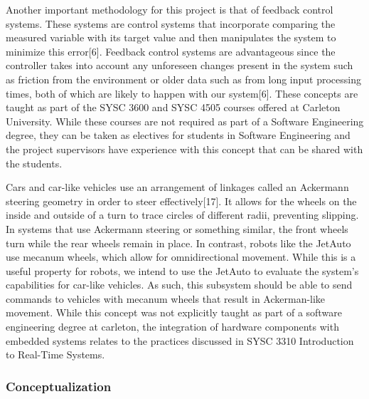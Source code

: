 \documentclass[titlepage]{article}
\begin{document}
Another important methodology for this project is that of feedback control systems. These systems are control systems that incorporate comparing the measured variable with its target value and then manipulates the system to minimize this error[6]. Feedback control systems are advantageous since the controller takes into account any unforeseen changes present in the system such as friction from the environment or older data such as from long input processing times, both of which are likely to happen with our system[6]. These concepts are taught as part of the SYSC 3600 and SYSC 4505 courses offered at Carleton University. While these courses are not required as part of a Software Engineering degree, they can be taken as electives for students in Software Engineering and the project supervisors have experience with this concept that can be shared with the students. 

Cars and car-like vehicles use an arrangement of linkages called an Ackermann steering geometry in order to steer effectively[17]. It allows for the wheels on the inside and outside of a turn to trace circles of different radii, preventing slipping. In systems that use Ackermann steering or something similar, the front wheels turn while the rear wheels remain in place. In contrast, robots like the JetAuto use mecanum wheels, which allow for omnidirectional movement. While this is a useful property for robots, we intend to use the JetAuto to evaluate the system’s capabilities for car-like vehicles. As such, this subsystem should be able to send commands to vehicles with mecanum wheels that result in Ackerman-like movement. While this concept was not explicitly taught as part of a software engineering degree at carleton, the integration of hardware components with embedded systems relates to the practices discussed in SYSC 3310 Introduction to Real-Time Systems. 

\subsubsection{Conceptualization}
\end{document}
